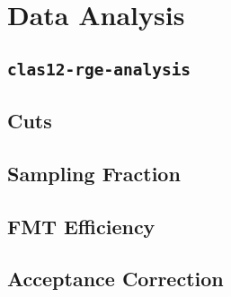 \section*{}
\begin{frame}{}
    \centering \Huge{}
\end{frame}

\section{Data Analysis}
\subsection{\texttt{clas12-rge-analysis}}


\subsection{Cuts}


\subsection{Sampling Fraction}


\subsection{FMT Efficiency}


\subsection{Acceptance Correction}

